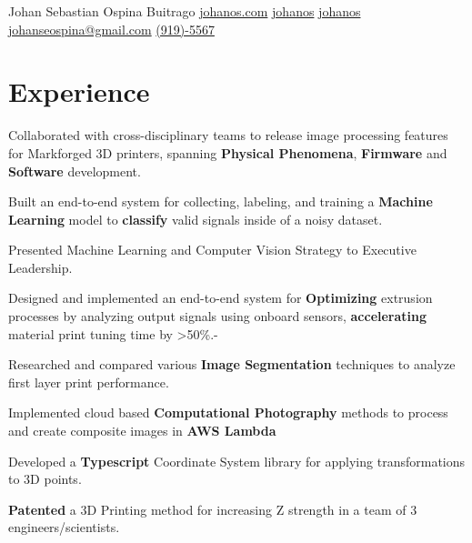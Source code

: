 \documentclass[]{plushcv}
\begin{document}
%
%
    
\namesection
{Johan Sebastian }
{Ospina Buitrago}
{}
{
    \contactline
    {\href{https://www.johanos.com}{johanos.com}}
    {\href{https://www.github.com/johanos}{johanos}}
    {\href{https://www.linkedin.com/in/johanos}
        {johanos}}
    {\href{mailto:johanseospina@gmail.com}{johanseospina@gmail.com}}
    {\href{tel:+1 (919) 946-5567}{(919)-5567}}
}

%
%

\begin{minipage}[t]{0.70\textwidth}



    \section{Experience}
    \vspace{\topsep} %
    \begin{tightemize}
        \sectionsep
        \item Collaborated with cross-disciplinary teams to release image processing features for Markforged 3D printers, spanning \textbf{Physical Phenomena}, \textbf{Firmware} and \textbf{Software} development.
        \item Built an end-to-end system for collecting, labeling, and training a \textbf{Machine Learning} model to \textbf{classify} valid signals inside of a noisy dataset.
        \item Presented Machine Learning and Computer Vision Strategy to Executive Leadership.
        \item Designed and implemented an end-to-end system for \textbf{Optimizing} extrusion processes by analyzing output signals using onboard sensors, \textbf{accelerating} material print tuning time by >50\%.-
        \item Researched and compared various \textbf{Image Segmentation} techniques to analyze first layer print performance.
        \item Implemented cloud based \textbf{Computational Photography} methods to process and create composite images in \textbf{AWS Lambda} 
        \item Developed a \textbf{Typescript} Coordinate System library for applying transformations to 3D points.
        \item \textbf{Patented} a 3D Printing method for increasing Z strength in a team of 3 engineers/scientists.
    \end{tightemize}
    \sectionsep


\end{minipage}
\end{document}

